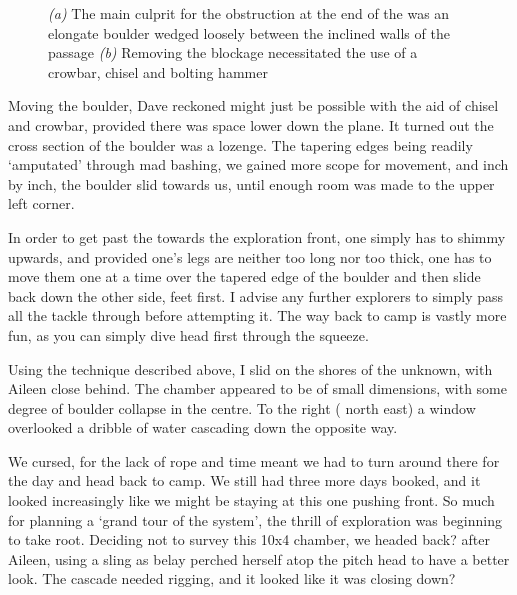\begin{figure}[t!]
\checkoddpage \ifoddpage \forcerectofloat \else \forceversofloat \fi
\centering
    \begin{subfigure}[t]{0.421\textwidth}
        \centering
        \caption{} \label{boulder_kamikaze}
    \end{subfigure}
        \hfill
\begin{subfigure}[t]{0.560\textwidth}
\centering
{}
 \caption{}\label{end of kamikaze}
\end{subfigure}
  \caption{
    \emph{(a)} The main culprit for the obstruction at the end of the \protect{} was an elongate boulder wedged loosely between the inclined walls of the passage
     \emph{(b)}  Removing the blockage necessitated the use of a crowbar, chisel and bolting hammer }
\end{figure}


Moving the boulder, Dave reckoned might just be possible with the aid of chisel and crowbar, provided there was space lower down the plane. It turned out the cross section of the boulder was a lozenge. The tapering edges being readily `amputated' through mad bashing, we gained more scope for movement, and inch by inch, the boulder slid towards us, until enough room was made to the upper left corner.

In order to get past the  towards the exploration front, one simply has to shimmy upwards, and provided one's legs are neither too long nor too thick, one has to move them one at a time over the tapered edge of the boulder and then slide back down the other side, feet first. I advise any further explorers to simply pass all the tackle through before attempting it. The way back to camp is vastly more fun, as you can simply dive head first through the squeeze.

Using the technique described above, I slid on the shores of the unknown, with Aileen close behind. The chamber appeared to be of small dimensions, with some degree of boulder collapse in the centre. To the right ( north east) a window overlooked a dribble of water cascading down the opposite way.

We cursed, for the lack of rope and time meant we had to turn around there for the day and head back to camp. We still had three more days booked, and it looked increasingly like we might be staying at this one pushing front. So much for planning a `grand tour of the system', the thrill of exploration was beginning to take root. Deciding not to survey this 10x4 chamber, we headed back? after Aileen, using a sling as belay perched herself atop the pitch head to have a better look. The cascade needed rigging, and it looked like it was closing down?


